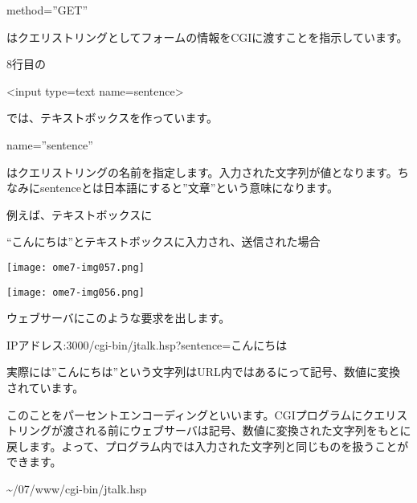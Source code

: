 method=”GET”

はクエリストリングとしてフォームの情報をCGIに渡すことを指示しています。

8行目の

{\textless}input type={\textquotedbl}text{\textquotedbl} name={\textquotedbl}sentence{\textquotedbl}{\textgreater}

では、テキストボックスを作っています。

name=”sentence”

はクエリストリングの名前を指定します。入力された文字列が値となります。ちなみにsentenceとは日本語にすると”文章”という意味になります。

例えば、テキストボックスに

“こんにちは”とテキストボックスに入力され、送信された場合

\clearpage

\centering
\texttt{[image: ome7-img057.png]}

\centering
\texttt{[image: ome7-img056.png]}
\flushleft

%

ウェブサーバにこのような要求を出します。

IPアドレス:3000/cgi-bin/jtalk.hsp?sentence=こんにちは

実際には”こんにちは”という文字列はURL内ではあるにって記号、数値に変換されています。

このことをパーセントエンコーディングといいます。CGIプログラムにクエリストリングが渡される前にウェブサーバは記号、数値に変換された文字列をもとに戻します。よって、プログラム内では入力された文字列と同じものを扱うことができます。

{\textasciitilde}/07/www/cgi-bin/jtalk.hsp

